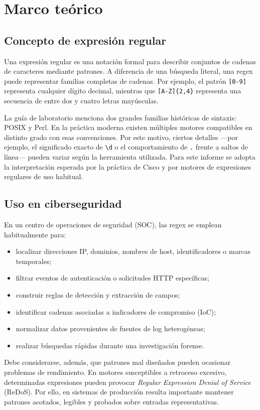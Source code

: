 \documentclass[11pt,a4paper]{article}
\newcommand{\regex}[1]{\texttt{#1}}
\begin{document}
\section{Marco teórico}

\subsection{Concepto de expresión regular}
Una expresión regular es una notación formal para describir conjuntos de cadenas de caracteres mediante patrones. A diferencia de una búsqueda literal, una regex puede representar familias completas de cadenas. Por ejemplo, el patrón \regex{[0-9]} representa cualquier dígito decimal, mientras que \regex{[A-Z]\{2,4\}} representa una secuencia de entre dos y cuatro letras mayúsculas.

La guía de laboratorio menciona dos grandes familias históricas de sintaxis: POSIX y Perl. En la práctica moderna existen múltiples motores compatibles en distinto grado con esas convenciones. Por este motivo, ciertos detalles ---por ejemplo, el significado exacto de \regex{\textbackslash d} o el comportamiento de \regex{.} frente a saltos de línea--- pueden variar según la herramienta utilizada. Para este informe se adopta la interpretación esperada por la práctica de Cisco y por motores de expresiones regulares de uso habitual.

\subsection{Uso en ciberseguridad}
En un centro de operaciones de seguridad (SOC), las regex se emplean habitualmente para:
\begin{itemize}
    \item localizar direcciones IP, dominios, nombres de host, identificadores o marcas temporales;
    \item filtrar eventos de autenticación o solicitudes HTTP específicas;
    \item construir reglas de detección y extracción de campos;
    \item identificar cadenas asociadas a indicadores de compromiso (IoC);
    \item normalizar datos provenientes de fuentes de log heterogéneas;
    \item realizar búsquedas rápidas durante una investigación forense.
\end{itemize}

Debe considerarse, además, que patrones mal diseñados pueden ocasionar problemas de rendimiento. En motores susceptibles a retroceso excesivo, determinadas expresiones pueden provocar \emph{Regular Expression Denial of Service} (ReDoS). Por ello, en sistemas de producción resulta importante mantener patrones acotados, legibles y probados sobre entradas representativas.
\end{document}
